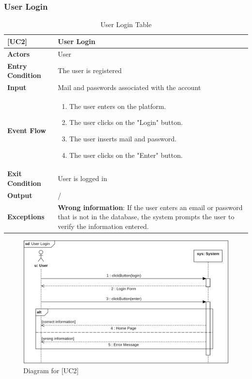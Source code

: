\subsubsection*{User Login}
\begin{table}[H]
    \centering
    \renewcommand{\arraystretch}{1.5}
    \begin{tabular}{|p{4cm}|p{11cm}|}
    \hline
    \rowcolor{bluepoli!40}
    \textbf{[UC2]} & \textbf{User Login} \\ \hline \hline
    \textbf{Actors} & User \\ \hline
    \textbf{Entry Condition} & The user is registered \\ \hline
    \textbf{Input} & Mail and passwords associated with the account \\ \hline
    \textbf{Event Flow} & 
    {\setlength{\leftmargini}{1.4em}
    \begin{enumerate}
        \item The user enters on the platform.
        \item The user clicks on the "Login" button.
        \item The user inserts mail and password.
        \item The user clicks on the "Enter" button.
    \end{enumerate}} \\ \hline
    \textbf{Exit Condition} & User is logged in \\ \hline
    \textbf{Output} & / \\ \hline
    \textbf{Exceptions} & 
    \textbf{Wrong information}: If the user enters an email or password that is not in the database, the system prompts the user to verify the information entered. \\ \hline
    \end{tabular}
    \caption{User Login Table}
\end{table}

\begin{figure} [H]
    \centering
    \includegraphics[width=1\linewidth]{Use Cases Images/user_login.png}
    \caption{Diagram for [UC2]}
    \label{fig: User Login Diagram}
\end{figure}

